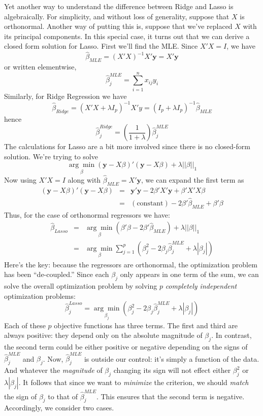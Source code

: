 \documentclass[12pt]{article}
\theoremstyle{definition}
\begin{document}
Yet another way to understand the difference between Ridge and Lasso is algebraically. For simplicity, and without loss of generality, suppose that $X$ is orthonormal. Another way of putting this is, suppose that we've replaced $X$ with its principal components. In this special case, it turns out that we can derive a closed form solution for Lasso. First we'll find the MLE. Since $X'X = I$, we have
	$$\widehat{\beta}_{MLE} = (X'X)^{-1}X'\textbf{y} = X'\textbf{y}$$
or written elementwise,
	$$\widehat{\beta}^{MLE}_j = \sum_{i=1}^n x_{ij}y_i$$
Similarly, for Ridge Regression we have
	$$\widehat{\beta}_{Ridge} =\left(X'X + \lambda I_p \right)^{-1}X'y = \left(I_p + \lambda I_p \right)^{-1} \widehat{\beta}_{MLE}$$
hence
	$$\widehat{\beta}^{Ridge}_j =  \left(\frac{1}{1+\lambda}\right)\widehat{\beta}^{MLE}_j$$
The calculations for Lasso are a bit more involved since there is no closed-form solution. We're trying to solve
	$$\underset{\beta}{\arg \min} (\mathbf{y}  - X\beta)' (\mathbf{y} - X\beta) + \lambda \left| \left| \beta\right| \right|_1$$
Now using $X'X = I$ along with $\widehat{\beta}_{MLE} = X'\textbf{y}$, we can expand the first term as
	\begin{eqnarray*}
		 (\mathbf{y}  - X\beta)' (\mathbf{y} - X\beta) &=& \mathbf{y}'\mathbf{y} - 2\beta' X' \mathbf{y} + \beta' X'X \beta \\
		 	&=& (\mbox{constant}) - 2\beta' \widehat{\beta}_{MLE} + \beta'\beta
	\end{eqnarray*}
Thus, for the case of orthonormal regressors we have:
\begin{eqnarray*}
	\widehat{\beta}_{Lasso} &=& \underset{\beta}{\arg \min} (\beta'\beta - 2\beta' \widehat{\beta}_{MLE})  +  \lambda \left| \left| \beta\right| \right|_1\\
		&=& \underset{\beta}{\arg \min}  \sum_{j=1}^p \left(\beta_j^2 - 2 \beta_j \widehat{\beta}^{MLE}_j + \lambda\left|\beta_j \right|\right)
\end{eqnarray*}
Here's the key: because the regressors are orthonormal, the optimization problem has been ``de-coupled.'' Since each $\beta_j$ only appears in one term of the sum, we can solve the overall optimization problem by solving $p$ \emph{completely independent} optimization problems:
	$$\widehat{\beta}^{Lasso}_j = \underset{\beta_j}{\arg \min} \left(\beta_j^2 - 2 \beta_j \widehat{\beta}^{MLE}_j + \lambda\left|\beta_j \right|\right)$$
Each of these $p$ objective functions has three terms. The first and third are always positive: they depend only on the absolute magnitude of $\beta_j$. In contrast, the second term could be either positive or negative depending on the signs of $\widehat{\beta}^{MLE}_j$ and $\beta_j$. Now, $\widehat{\beta}^{MLE}_j$ is outside our control: it's simply a function of the data. And whatever the \emph{magnitude} of $\beta_j$ changing its sign will not effect either $\beta_j^2$ or $\lambda|\beta_j|$. It follows that since we want to \emph{minimize} the criterion, we should \emph{match} the sign of $\beta_j$ to that of $\widehat{\beta}^{MLE}_j$. This ensures that the second term is negative. Accordingly, we consider two cases. 
\end{document}
